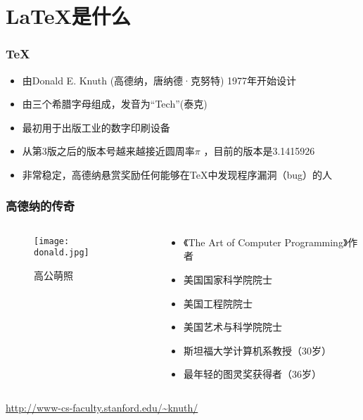 \section{\LaTeX{}是什么}
\begin{frame}
    \frametitle{\TeX{}}
    \begin{itemize}
         \item 由Donald E. Knuth (高德纳，唐纳德·克努特) 1977年开始设计
         \item 由三个希腊字母组成，发音为“Tech”(泰克)
         \item 最初用于出版工业的数字印刷设备
         \item 从第3版之后的版本号越来越接近圆周率$\pi$ ，目前的版本是3.1415926
         \item 非常稳定，高德纳悬赏奖励任何能够在\TeX{}中发现程序漏洞（bug）的人
    \end{itemize}
\end{frame}

\begin{frame}\frametitle{高德纳的传奇}
    \begin{columns}

    	\begin{column}{0.3\textwidth}
        	\begin{figure}[h]
                \texttt{[image: donald.jpg]}
                \caption{高公萌照}
            \end{figure}
    	\end{column}

    	\begin{column}{0.7\textwidth}
        	\begin{itemize}
                 \item 《The Art of Computer Programming》作者
                 \item  美国国家科学院院士
                 \item  美国工程院院士
                 \item  美国艺术与科学院院士
                 \item  斯坦福大学计算机系教授（30岁）
                 \item  最年轻的图灵奖获得者（36岁）
            \end{itemize}
    	\end{column}

    \end{columns}


    \begin{center}
        \footnotesize{\url{http://www-cs-faculty.stanford.edu/~knuth/}}
    \end{center}

\end{frame}

